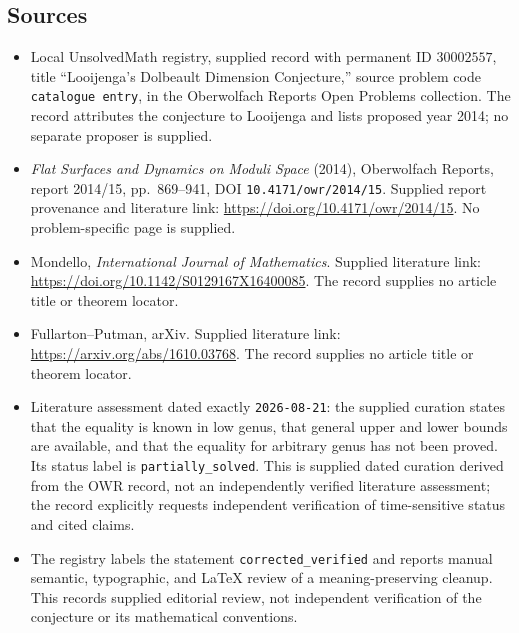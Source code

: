 \documentclass[11pt]{article}
\begin{document}
\subsection{Sources}
\begin{itemize}
\item Local UnsolvedMath registry, supplied record with permanent ID \(30002557\), title ``Looijenga's Dolbeault Dimension Conjecture,'' source problem code \texttt{catalogue entry}, in the Oberwolfach Reports Open Problems collection. The record attributes the conjecture to Looijenga and lists proposed year 2014; no separate proposer is supplied.
\item \emph{Flat Surfaces and Dynamics on Moduli Space} (2014), Oberwolfach Reports, report 2014/15, pp.~869--941, DOI \texttt{10.4171/owr/2014/15}. Supplied report provenance and literature link: \url{https://doi.org/10.4171/owr/2014/15}. No problem-specific page is supplied.
\item Mondello, \emph{International Journal of Mathematics}. Supplied literature link: \url{https://doi.org/10.1142/S0129167X16400085}. The record supplies no article title or theorem locator.
\item Fullarton--Putman, arXiv. Supplied literature link: \url{https://arxiv.org/abs/1610.03768}. The record supplies no article title or theorem locator.
\item Literature assessment dated exactly \texttt{2026-08-21}: the supplied curation states that the equality is known in low genus, that general upper and lower bounds are available, and that the equality for arbitrary genus has not been proved. Its status label is \texttt{partially\_solved}. This is supplied dated curation derived from the OWR record, not an independently verified literature assessment; the record explicitly requests independent verification of time-sensitive status and cited claims.
\item The registry labels the statement \texttt{corrected\_verified} and reports manual semantic, typographic, and LaTeX review of a meaning-preserving cleanup. This records supplied editorial review, not independent verification of the conjecture or its mathematical conventions.
\end{itemize}
\end{document}
